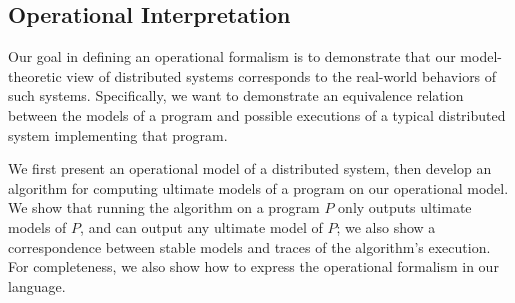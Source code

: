 

\subsection{Operational Interpretation}
\label{sec:operational}

Our goal in defining an operational formalism is to demonstrate that our model-theoretic view of distributed systems corresponds to the real-world behaviors of such systems.  Specifically, we want to demonstrate an equivalence relation between the models of a \lang program and possible executions of a typical distributed system implementing that program.

We first present an operational model of a distributed system, then
develop an algorithm for computing ultimate models of a \lang program on our operational model.  We show that running the algorithm on a program $P$ only outputs ultimate models of $P$, and can output any ultimate model of $P$; we also show a correspondence between stable models and traces of the algorithm's execution.  For completeness, we also show how to express the operational formalism in our language.


